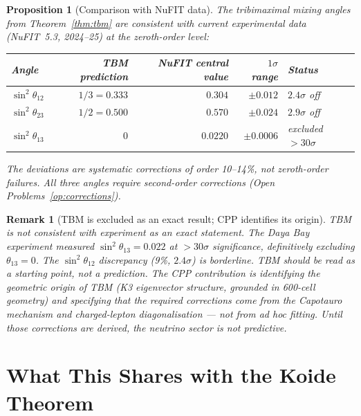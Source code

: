 \documentclass[11pt]{article}
\newtheorem{proposition}[theorem]{Proposition}
\newtheorem{remark}{Remark}[section]
\begin{document}
\begin{proposition}[Comparison with NuFIT data]
\label{prop:nufit}
The tribimaximal mixing angles from Theorem~\ref{thm:tbm} are consistent
with current experimental data (NuFIT~5.3, 2024--25) at the zeroth-order
level:
\begin{center}
\renewcommand{\arraystretch}{1.3}
\begin{tabular}{lrrrl}
\toprule
Angle & TBM prediction & NuFIT central value & $1\sigma$ range & Status \\
\midrule
$\sin^2\theta_{12}$ & $1/3 = 0.333$ & $0.304$ & $\pm 0.012$ & $2.4\sigma$ off \\
$\sin^2\theta_{23}$ & $1/2 = 0.500$ & $0.570$ & $\pm 0.024$ & $2.9\sigma$ off \\
$\sin^2\theta_{13}$ & $0$ & $0.0220$ & $\pm 0.0006$ & excluded $>30\sigma$ \\
\bottomrule
\end{tabular}
\end{center}
The deviations are systematic corrections of order 10--14\%, not zeroth-order
failures.  All three angles require second-order corrections
(Open Problems~\ref{op:corrections}).
\end{proposition}

\begin{remark}[TBM is excluded as an exact result; CPP identifies its origin]
TBM is \emph{not} consistent with experiment as an exact statement.
The Daya Bay experiment measured $\sin^2\theta_{13} = 0.022$ at
$>30\sigma$ significance, definitively excluding $\theta_{13} = 0$.
The $\sin^2\theta_{12}$ discrepancy (9\%, $2.4\sigma$) is borderline.
TBM should be read as a \emph{starting point}, not a prediction.
The CPP contribution is identifying the geometric origin of TBM
(K3 eigenvector structure, grounded in 600-cell geometry) and
specifying that the required corrections come from the Capotauro
mechanism and charged-lepton diagonalisation --- not from ad hoc
fitting.  Until those corrections are derived, the neutrino sector
is not predictive.
\end{remark}

\section{What This Shares with the Koide Theorem}
\end{document}
